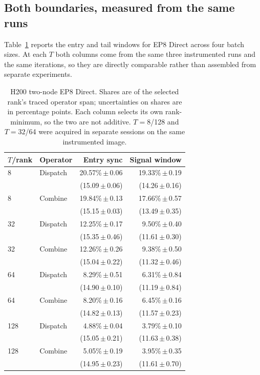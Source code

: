 \subsection{Both boundaries, measured from the same runs}
\label{sec:paired}
Table~\ref{tab:paired} reports the entry and tail windows for EP8 Direct across four
batch sizes. At each $T$ both columns come from the same three instrumented runs and
the same iterations, so they are directly comparable rather than assembled from
separate experiments.

\begin{table}[t]
\centering\small
\setlength{\tabcolsep}{4pt}
\begin{tabular}{llrr}
\toprule
$T$/rank & Operator & Entry sync & Signal window\\
\midrule
8 & Dispatch & 20.57\%\,$\pm$\,0.06 & 19.33\%\,$\pm$\,0.19\\
  &          & (15.09\,$\pm$\,0.06\us{}) & (14.26\,$\pm$\,0.16\us{})\\
8 & Combine  & 19.84\%\,$\pm$\,0.13 & 17.66\%\,$\pm$\,0.57\\
  &          & (15.15\,$\pm$\,0.03\us{}) & (13.49\,$\pm$\,0.35\us{})\\
\midrule
32 & Dispatch & 12.25\%\,$\pm$\,0.17 & 9.50\%\,$\pm$\,0.40\\
   &          & (15.35\,$\pm$\,0.46\us{}) & (11.61\,$\pm$\,0.30\us{})\\
32 & Combine  & 12.26\%\,$\pm$\,0.26 & 9.38\%\,$\pm$\,0.50\\
   &          & (15.04\,$\pm$\,0.22\us{}) & (11.32\,$\pm$\,0.46\us{})\\
\midrule
64 & Dispatch & 8.29\%\,$\pm$\,0.51 & 6.31\%\,$\pm$\,0.84\\
   &          & (14.90\,$\pm$\,0.10\us{}) & (11.19\,$\pm$\,0.84\us{})\\
64 & Combine  & 8.20\%\,$\pm$\,0.16 & 6.45\%\,$\pm$\,0.16\\
   &          & (14.82\,$\pm$\,0.13\us{}) & (11.57\,$\pm$\,0.23\us{})\\
\midrule
128 & Dispatch & 4.88\%\,$\pm$\,0.04 & 3.79\%\,$\pm$\,0.10\\
    &          & (15.05\,$\pm$\,0.21\us{}) & (11.63\,$\pm$\,0.38\us{})\\
128 & Combine  & 5.05\%\,$\pm$\,0.19 & 3.95\%\,$\pm$\,0.35\\
    &          & (14.95\,$\pm$\,0.23\us{}) & (11.61\,$\pm$\,0.70\us{})\\
\bottomrule
\end{tabular}
\caption{H200 two-node EP8 Direct. Shares are of the selected rank's traced operator
span; uncertainties on shares are in percentage points. Each column selects its own
rank-minimum, so the two are not additive. $T=8$/128 and $T=32$/64 were acquired in
separate sessions on the same instrumented image.}
\label{tab:paired}
\end{table}

